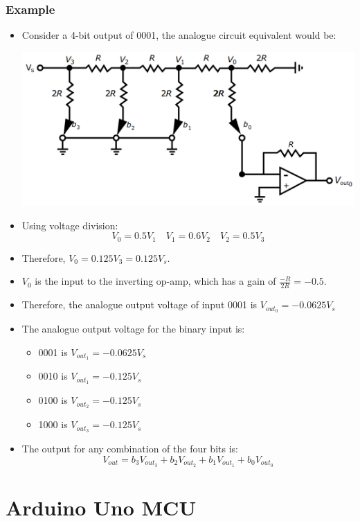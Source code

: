 \documentclass[11pt]{article}
\begin{document}
\subsubsection{Example}
\label{sec:orgdded693}
\begin{itemize}
\item Consider a 4-bit output of 0001, the analogue circuit equivalent would be:
\begin{center}
\includegraphics[width=.9\linewidth]{./images/digital-to-analogue-converter-analogue-circuit-equivalent-of-0001.png}
\end{center}
\item Using voltage division:
\[V_0 = 0.5 V_1 \quad V_1 = 0.6 V_2 \quad V_2 = 0.5 V_3\]
\item Therefore, \(V_0 = 0.125 V_3 = 0.125 V_s\).
\item \(V_0\) is the input to the inverting op-amp, which has a gain of \(\frac{-R}{2R} = -0.5\).
\item Therefore, the analogue output voltage of input 0001 is \(V_{out_0} = -0.0625V_s\)
\item The analogue output voltage for the binary input is:
\begin{itemize}
\item 0001 is \(V_{out_1} = - 0.0625 V_s\)
\item 0010 is \(V_{out_1} = - 0.125 V_s\)
\item 0100 is \(V_{out_2} = - 0.125 V_s\)
\item 1000 is \(V_{out_3} = - 0.125 V_s\)
\end{itemize}
\item The output for any combination of the four bits is:
\[V_{out} = b_3 V_{out_3} + b_2 V_{out_2} + b_1 V_{out_1} + b_0 V_{out_0}\]
\end{itemize}

\section{Arduino Uno MCU}
\label{sec:orgcf55769}
\end{document}
